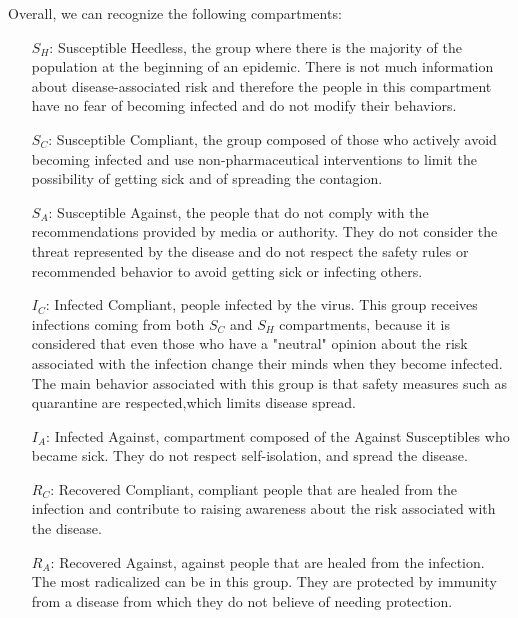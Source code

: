 Overall, we can recognize the following compartments:
\begin{itemize}
	\item[$S_H$:] Susceptible Heedless, the group where there is the majority of the population at the beginning of an epidemic. There is not much information about disease-associated risk and therefore the people in this compartment have no fear of becoming infected and do not modify their behaviors.
	\item[$S_C$:] Susceptible Compliant, the group composed of those who actively avoid becoming infected and use non-pharmaceutical interventions to limit the possibility of getting sick and of spreading the contagion.
	\item[$S_A$:] Susceptible Against, the people that do not comply with the recommendations provided by media or authority. They do not consider the threat represented by the disease and do not respect the safety rules or recommended behavior to avoid getting sick or infecting others. 
	\item[$I_C$:] Infected Compliant, people infected by the virus. This group receives infections coming from both $S_C$ and $S_H$ compartments, because it is considered that even those who have a "neutral" opinion about the risk associated with the infection change their minds when they become infected. The main behavior associated with this group is that safety measures such as quarantine are respected,which limits disease spread.
	\item[$I_A$:] Infected Against, compartment composed of the Against Susceptibles who became sick. They do not respect self-isolation, and spread the disease. 
	\item[$R_C$:] Recovered Compliant, compliant people that are healed from the infection and contribute to raising awareness about the risk associated with the disease. 
	\item[$R_A$:] Recovered Against, against people that are healed from the infection. The most radicalized can be in this group. They are protected by immunity from a disease from which they do not believe of needing protection. 
\end{itemize}


